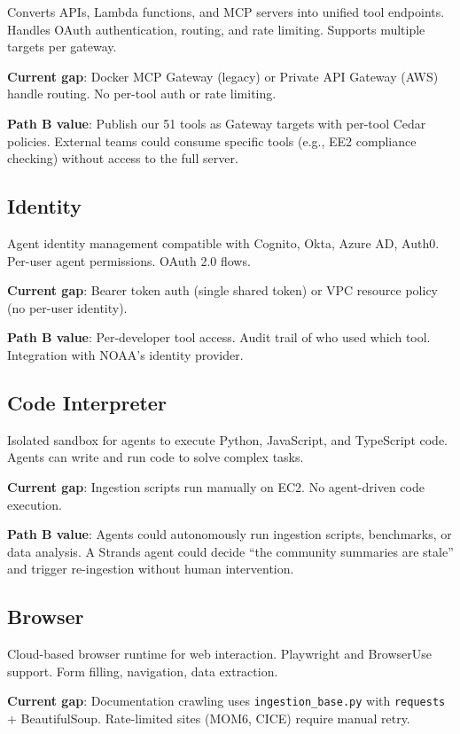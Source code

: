\documentclass[11pt,letterpaper]{article}
\begin{document}
Converts APIs, Lambda functions, and MCP servers into unified tool
endpoints. Handles OAuth authentication, routing, and rate limiting.
Supports multiple targets per gateway.

\textbf{Current gap}: Docker MCP Gateway (legacy) or Private API Gateway
(AWS) handle routing. No per-tool auth or rate limiting.

\textbf{Path B value}: Publish our 51 tools as Gateway targets with
per-tool Cedar policies. External teams could consume specific tools
(e.g., EE2 compliance checking) without access to the full server.

\subsection{Identity}

Agent identity management compatible with Cognito, Okta, Azure AD, Auth0.
Per-user agent permissions. OAuth 2.0 flows.

\textbf{Current gap}: Bearer token auth (single shared token) or VPC
resource policy (no per-user identity).

\textbf{Path B value}: Per-developer tool access. Audit trail of who
used which tool. Integration with NOAA's identity provider.

\subsection{Code Interpreter}

Isolated sandbox for agents to execute Python, JavaScript, and TypeScript
code. Agents can write and run code to solve complex tasks.

\textbf{Current gap}: Ingestion scripts run manually on EC2. No
agent-driven code execution.

\textbf{Path B value}: Agents could autonomously run ingestion scripts,
benchmarks, or data analysis. A Strands agent could decide ``the
community summaries are stale'' and trigger re-ingestion without human
intervention.

\subsection{Browser}

Cloud-based browser runtime for web interaction. Playwright and BrowserUse
support. Form filling, navigation, data extraction.

\textbf{Current gap}: Documentation crawling uses \texttt{ingestion\_base.py}
with \texttt{requests} + BeautifulSoup. Rate-limited sites (MOM6, CICE)
require manual retry.
\end{document}
